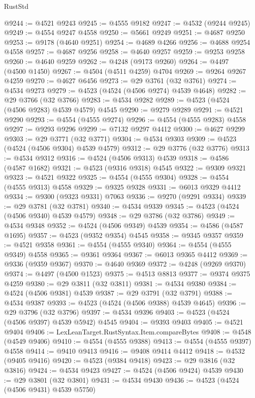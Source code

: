 \begin{lexlean}{RustStd}
\begin{coremodule}
@9244 := @4521 @9243
@9245 := @4555 @9182
@9247 := @4532 (@9244 @9245)
@9249 := @4554 @9247 @4558
@9250 := @5661 @9249
@9251 := @4687 @9250
@9253 := @9178 (@4640 @9251)
@9254 := @4689 @4266
@9256 := @4688 @9254 @4558
@9257 := @4687 @9256
@9258 := @4640 @9257
@9259 := @9253 @9258
@9260 := @4640 @9259
@9262 := @4248 (@9173 @9260)
@9264 := @4497 (@4500 @1450)
@9267 := @4504 (@4511 @4259) @4704
@9269 := @9264 @9267 @4259
@9270 := @4627 @6456
@9273 := @29 @3761 (@32 @3761)
@9274 := @4534 @9273
@9279 := @4523 (@4524 (@4506 @9274) @4539 @4648)
@9282 := @29 @3766 (@32 @3766)
@9283 := @4534 @9282
@9289 := @4523 (@4524 (@4506 @9283) @4539 @4579) @4545
@9290 := @9279 @9289
@9291 := @4521 @9290
@9293 := @4554 (@4555 @9274)
@9296 := @4554 (@4555 @9283) @4558
@9297 := @9293 @9296
@9299 := @7132 @9297 @4412
@9300 := @4627 @9299
@9303 := @29 @3771 (@32 @3771)
@9304 := @4534 @9303
@9309 := @4523 (@4524 (@4506 @9304) @4539 @4579)
@9312 := @29 @3776 (@32 @3776)
@9313 := @4534 @9312
@9316 := @4524 (@4506 @9313) @4539
@9318 := @4586 (@4587 @1682)
@9321 := @4523 (@9316 @9318) @4545
@9322 := @9309 @9321
@9323 := @4521 @9322
@9325 := @4554 (@4555 @9304)
@9328 := @4554 (@4555 @9313) @4558
@9329 := @9325 @9328
@9331 := @6013 @9329 @4412
@9334 := @9300 (@9323 @9331) @7063
@9336 := @9270 (@9291 @9334)
@9339 := @29 @3781 (@32 @3781)
@9340 := @4534 @9339
@9345 := @4523 (@4524 (@4506 @9340) @4539 @4579)
@9348 := @29 @3786 (@32 @3786)
@9349 := @4534 @9348
@9352 := @4524 (@4506 @9349) @4539
@9354 := @4586 (@4587 @1695)
@9357 := @4523 (@9352 @9354) @4545
@9358 := @9345 @9357
@9359 := @4521 @9358
@9361 := @4554 (@4555 @9340)
@9364 := @4554 (@4555 @9349) @4558
@9365 := @9361 @9364
@9367 := @6013 @9365 @4412
@9369 := @9336 (@9359 @9367)
@9370 := @4640 @9369
@9372 := @4248 (@9269 @9370)
@9374 := @4497 (@4500 @1523)
@9375 := @4513 @8813
@9377 := @9374 @9375 @4259
@9380 := @29 @3811 (@32 @3811)
@9381 := @4534 @9380
@9384 := @4524 (@4506 @9381) @4539
@9387 := @29 @3791 (@32 @3791)
@9388 := @4534 @9387
@9393 := @4523 (@4524 (@4506 @9388) @4539 @4645)
@9396 := @29 @3796 (@32 @3796)
@9397 := @4534 @9396
@9403 := @4523 (@4524 (@4506 @9397) @4539 @5942) @4545
@9404 := @9393 @9403
@9405 := @4521 @9404
@9406 := LexLeanTarget.RustSyntax.Item.compareBytes
@9408 := @4548 (@4549 @9406)
@9410 := @4554 (@4555 @9388)
@9413 := @4554 (@4555 @9397) @4558
@9414 := @9410 @9413
@9416 := @9408 @9414 @4412
@9418 := @4532 (@9405 @9416)
@9420 := @4523 (@9384 @9418)
@9423 := @29 @3816 (@32 @3816)
@9424 := @4534 @9423
@9427 := @4524 (@4506 @9424) @4539
@9430 := @29 @3801 (@32 @3801)
@9431 := @4534 @9430
@9436 := @4523 (@4524 (@4506 @9431) @4539 @5750)

\end{coremodule}
\end{lexlean}

